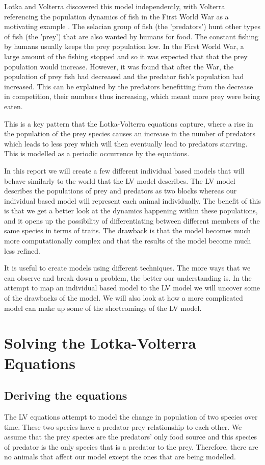 \documentclass[12pt, a4paper]{article}
\begin{document}
Lotka and Volterra discovered this model independently, with Volterra referencing the population dynamics of fish in the First World War as a motivating example \cite{volterra1926}. The selacian group of fish (the 'predators') hunt other types of fish (the 'prey') that are also wanted by humans for food. The constant fishing by humans usually keeps the prey population low. In the First World War, a large amount of the fishing stopped and so it was expected that that the prey population would increase. However, it was found that after the War, the population of prey fish had decreased and the predator fish's population had increased. This can be explained by the predators benefitting from the decrease in competition, their numbers thus increasing, which meant more prey were being eaten.

This is a key pattern that the Lotka-Volterra equations capture, where a rise in the population of the prey species causes an increase in the number of predators which leads to less prey which will then eventually lead to predators starving. This is modelled as a periodic occurrence by the equations.

In this report we will create a few different individual based models that will behave similarly to the world that the LV model describes. The LV model describes the populations of prey and predators as two blocks whereas our individual based model will represent each animal individually. The benefit of this is that we get a better look at the dynamics happening within these populations, and it opens up the possibility of differentiating between different members of the same species in terms of traits. The drawback is that the model becomes much more computationally complex and that the results of the model become much less refined.

It is useful to create models using different techniques. The more ways that we can observe and break down a problem, the better our understanding is. In the attempt to map an individual based model to the LV model we will uncover some of the drawbacks of the model. We will also look at how a more complicated model can make up some of the shortcomings of the LV model.

\section{Solving the Lotka-Volterra Equations}
\subsection{Deriving the equations}
The LV equations attempt to model the change in population of two species over time. These two species have a predator-prey relationship to each other. We assume that the prey species are the predators' only food source and this species of predator is the only species that is a predator to the prey. Therefore, there are no animals that affect our model except the ones that are being modelled.
\end{document}
